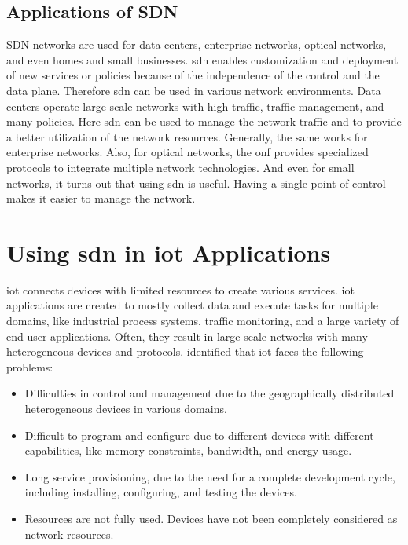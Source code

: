 \documentclass[conference]{IEEEtran}
\begin{document}
	\subsection{Applications of SDN}

	SDN networks are used for data centers, enterprise networks, optical networks, and even homes and small businesses. \ac{sdn} enables customization and deployment of new services or policies because of the independence of the control and the data plane. Therefore \ac{sdn} can be used in various network environments. Data centers operate large-scale networks with high traffic, traffic management, and many policies. Here \ac{sdn} can be used to manage the network traffic and to provide a better utilization of the network resources. Generally, the same works for enterprise networks. Also, for optical networks, the \ac{onf} provides specialized protocols to integrate multiple network technologies. And even for small networks, it turns out that using \ac{sdn} is useful. Having a single point of control makes it easier to manage the network. \cite{Jefia2018-pj} 

	\section{Using \ac{sdn} in \ac{iot} Applications}
	\label{sec:sdn-iot}

	\acf{iot} connects devices with limited resources to create various services. \ac{iot} applications are created to mostly collect data and execute tasks for multiple domains, like industrial process systems, traffic monitoring, and a large variety of end-user applications. Often, they result in large-scale networks with many heterogeneous devices and protocols. \cite{Li2020-lx} \citeauthor{Li2020-lx} identified that \ac{iot} faces the following problems: 

	\begin{itemize}
		\item Difficulties in control and management due to the geographically distributed heterogeneous devices in various domains.
		\item Difficult to program and configure due to different devices with different capabilities, like memory constraints, bandwidth, and energy usage.
		\item Long service provisioning, due to the need for a complete development cycle, including installing, configuring, and testing the devices. 
		\item Resources are not fully used. Devices have not been completely considered as network resources. \cite{Sahrish2017}
	\end{itemize}
\end{document}
